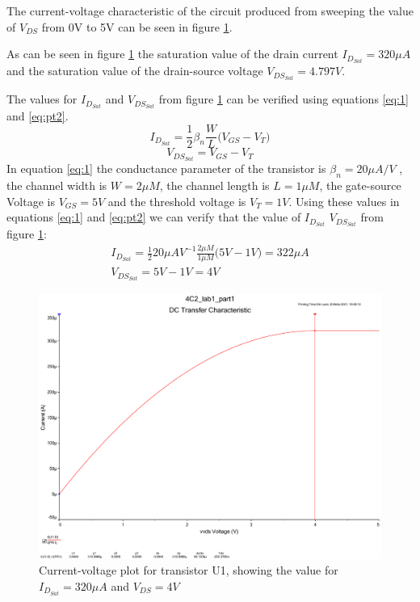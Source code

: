 \documentclass[11pt, a4paper]{article}
\begin{document}
The current-voltage characteristic of the circuit produced from sweeping the value of $V_{DS}$ from 0V to 5V can be seen in figure \ref{fig:graph1}. 

As can be seen in figure \ref{fig:graph1} the saturation value of the drain current $I_{D_{Sat}} = 320 \mu A$ and the saturation value of the drain-source voltage $V_{DS_{Sat}} = 4.797V$.

The values for $I_{D_{Sat}}$ and $V_{DS_{Sat}}$ from figure \ref{fig:graph1} can be verified using equations \ref{eq:1} and \ref{eq:pt2}.
\begin{equation}
  \label{eq:1}
  I_{D_{Sat}} = \frac{1}{2}\beta_{n}\frac{W}{L}\bigg(V_{GS} - V_T\bigg)
\end{equation}
\begin{equation}
    V_{DS_{Sat}} = V_{GS} - V_T
    \label{eq:pt2}
\end{equation}
In equation \ref{eq:1} the conductance parameter of the transistor is $\beta_n = 20 \mu A/V$ , the channel width 
is $W = 2\mu M$, the channel length is $L = 1 \mu M$, the gate-source Voltage is $V_{GS} = 5V$
and the threshold voltage is $V_T = 1V$. Using these values in equations \ref{eq:1} and \ref{eq:pt2} we can verify that the value of $I_{D_{Sat}}$ $V_{DS_{Sat}}$ from figure \ref{fig:graph1}:
\begin{gather}
    I_{D_{Sat}} = \frac{1}{2}20 \mu AV^{-1}\frac{2\mu M}{1 \mu M}\bigg(5V - 1V\bigg) = 322 \mu A \\
    V_{DS_{Sat}} = 5V - 1V = 4V 
\end{gather}    

\begin{figure}
  \centering
  \includegraphics[width=\textwidth]{report/img/question_2/g1.pdf}
  \caption{\centering Current-voltage plot for transistor U1, showing the value for $I_{D_{Sat}} = 320 \mu A$ and $V_{DS} = 4V$}
    \label{fig:graph1}
\end{figure}
\end{document}
